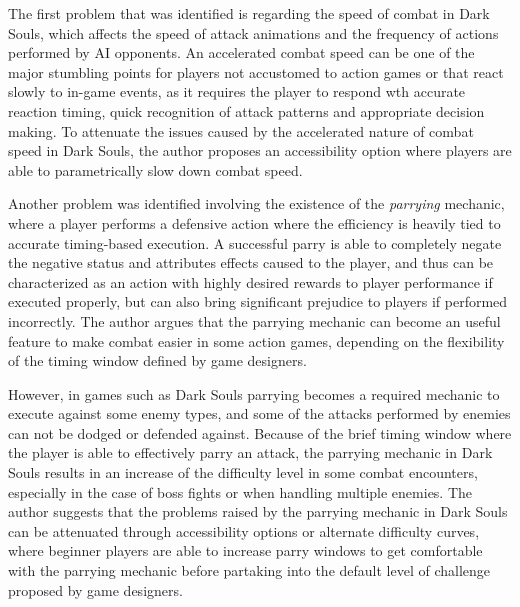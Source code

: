 The first problem that was identified is regarding the speed of combat in Dark Souls, which affects the speed of attack animations and the frequency of actions performed by AI opponents. An accelerated combat speed can be one of the major stumbling points for players not accustomed to action games or that react slowly to in-game events, as it requires the player to respond wth accurate reaction timing, quick recognition of attack patterns and appropriate decision making. To attenuate the issues caused by the accelerated nature of combat speed in Dark Souls, the author proposes an accessibility option where players are able to parametrically slow down combat speed.

Another problem was identified involving the existence of the \emph{parrying} mechanic, where a player performs a defensive action where the efficiency is heavily tied to accurate timing-based execution. A successful parry is able to completely negate the negative status and attributes effects caused to the player, and thus can be characterized as an action with highly desired rewards to player performance if executed properly, but can also bring significant prejudice to players if performed incorrectly. The author argues that the parrying mechanic can become an useful feature to make combat easier in some action games, depending on the flexibility of the timing window defined by game designers.

However, in games such as Dark Souls parrying becomes a required mechanic to execute against some enemy types, and some of the attacks performed by enemies can not be dodged or defended against. Because of the brief timing window where the player is able to effectively parry an attack, the parrying mechanic in Dark Souls results in an increase of the difficulty level in some combat encounters, especially in the case of boss fights or when handling multiple enemies. The author suggests that the problems raised by the parrying mechanic in Dark Souls can be attenuated through accessibility options or alternate difficulty curves, where beginner players are able to increase parry windows to get comfortable with the parrying mechanic before partaking into the default level of challenge proposed by game designers.

